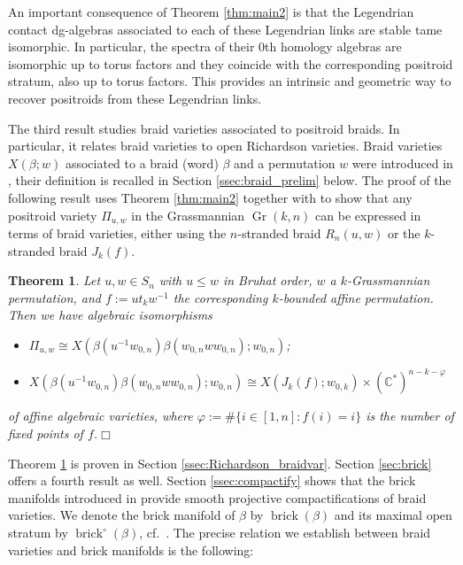 \documentclass[10pt]{amsart}
\theoremstyle{plain}
\newtheorem{thm}{Theorem}[section]
\theoremstyle{definition}
\theoremstyle{remark}
\numberwithin{equation}{section}
\newcommand{\bC}{\mathbb{C}}
\newcommand{\brick}{\operatorname{brick}}
\DeclareMathOperator{\Gr}{Gr}
\begin{document}
\noindent An important consequence of Theorem \ref{thm:main2} is that the Legendrian contact dg-algebras associated to each of these Legendrian links are stable tame isomorphic. In particular, the spectra of their $0$th  homology algebras are isomorphic up to torus factors and they coincide with the corresponding positroid stratum, also up to torus factors. This provides an intrinsic and geometric way to recover positroids from these Legendrian links.

The third result studies braid varieties associated to positroid braids. In particular,  it relates braid varieties to open Richardson varieties. Braid varieties $X(\beta;w)$ associated to a braid (word) $\beta$ and a permutation $w$ were introduced in \cite{CGGS}, their definition is recalled in Section \ref{ssec:braid_prelim} below. The proof of the following result uses Theorem \ref{thm:main2} together with \cite{KLS} to show that any positroid variety $\Pi_{u, w}$ in the Grassmannian $\Gr(k, n)$ can be expressed in terms of braid varieties, either using the $n$-stranded braid $R_{n}(u, w)$ or the $k$-stranded braid $J_{k}(f)$.

\begin{thm}\label{thm:rich vs juggling intro}
Let $u,w\in S_{n}$ with  $u\leq w$ in Bruhat order, $w$ a $k$-Grassmannian permutation, and $f := ut_{k}w^{-1}$ the corresponding $k$-bounded affine permutation. Then we have algebraic isomorphisms 
\begin{itemize}
    \item[(i)] $\Pi_{u, w} %
\cong X(\beta(u^{-1}w_{0,n})\beta(w_{0,n}ww_{0,n});w_{0,n})$;\\

\item[(ii)] $X(\beta(u^{-1}w_{0,n})\beta(w_{0,n}ww_{0,n});w_{0,n})\cong  X(J_{k}(f);w_{0,k}) \times (\bC^{*})^{n-k-\varphi}$
\end{itemize} 
of affine algebraic varieties, where $\varphi := \#\{i \in [1,n] : f(i) = i\}$ is the number of fixed points of $f$.\hfill$\Box$ 
\end{thm}

\noindent Theorem \ref{thm:rich vs juggling intro} is proven in Section \ref{ssec:Richardson_braidvar}. Section \ref{sec:brick} offers a fourth result as well. Section \ref{ssec:compactify} shows that the brick manifolds introduced in \cite[Definition 3.2]{Escobar} provide smooth projective compactifications of braid varieties. %
We denote the brick manifold of $\beta$ by $\brick(\beta)$ and its maximal open stratum by $\brick^{\circ}(\beta)$, cf.~\cite{Escobar}. The precise relation we establish between braid varieties and brick manifolds %
is the following:
\end{document}
